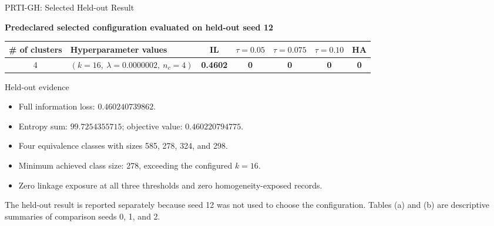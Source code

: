 \documentclass[9pt]{beamer}
\begin{document}
\begin{frame}[t]{PRTI-GH: Selected Held-out Result}
    \scriptsize
    \centering

    \textbf{Predeclared selected configuration evaluated on held-out seed 12}

    \vspace{0.35cm}
    \renewcommand{\arraystretch}{1.25}
    \setlength{\tabcolsep}{3pt}

    \begin{tabular*}{\textwidth}{@{}@{\extracolsep{\fill}}clccccc@{}}
        \toprule
        \textbf{\# of clusters} & \textbf{Hyperparameter values} & \textbf{IL} &
        \textbf{$\tau=0.05$} & \textbf{$\tau=0.075$} &
        \textbf{$\tau=0.10$} & \textbf{HA} \\
        \midrule
        \rowcolor{lightblue}
        4 & $(k=16,\ \lambda=0.0000002,\ n_c=4)$ &
        \textbf{0.4602} & \textbf{0} & \textbf{0} & \textbf{0} & \textbf{0} \\
        \bottomrule
    \end{tabular*}

    \vspace{0.45cm}
    \begin{block}{Held-out evidence}
        \begin{itemize}
            \item Full information loss: $0.460240739862$.
            \item Entropy sum: $99.7254355715$; objective value: $0.460220794775$.
            \item Four equivalence classes with sizes 585, 278, 324, and 298.
            \item Minimum achieved class size: 278, exceeding the configured $k=16$.
            \item Zero linkage exposure at all three thresholds and zero
            homogeneity-exposed records.
        \end{itemize}
    \end{block}

    \vspace{0.2cm}
    \begin{minipage}{0.96\textwidth}
        \scriptsize
        The held-out result is reported separately because seed 12 was not
        used to choose the configuration. Tables (a) and (b) are descriptive
        summaries of comparison seeds 0, 1, and 2.
    \end{minipage}
\end{frame}
\end{document}

